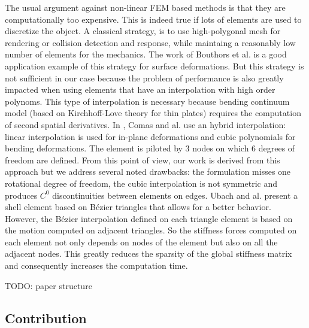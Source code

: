 \documentclass{egpubl}
\begin{document}
The usual argument against non-linear FEM based methods is that they are computationally too expensive. 
This is indeed true if lots of elements are used to discretize the object.
A classical strategy, is to use high-polygonal mesh for rendering or collision detection and response, while maintaing a reasonably low number of elements for the mechanics.
The work of Bouthors et al.\cite{Bouthors2007} is a good application example of this strategy for surface deformations.
But this strategy is not sufficient in our case because the problem of performance is also greatly impacted when using elements that have an interpolation with high order polynoms.
This type of interpolation is necessary because bending continuum model
(based on Kirchhoff-Love theory for thin plates)  requires the computation of second spatial derivatives.
In \cite{Comas2010c}, Comas and al.  use an hybrid interpolation: linear interpolation is used for in-plane deformations and cubic polynomials for bending deformations.
The element is piloted by 3 nodes on which 6 degrees of freedom are defined. 
From this point of view, our work is derived from this approach but we address several noted drawbacks: the formulation misses one rotational degree of freedom, the cubic interpolation is not symmetric and produces $C^0$  discontinuities between elements on edges.
Ubach and al. \cite{Ubach2010}  present a shell element based on B\'ezier triangles that allows for a better behavior.
However, the B\'ezier interpolation defined on each triangle element is based on the motion computed on adjacent triangles.
So the stiffness forces computed on each element not only depends on nodes of the element but also on all the adjacent nodes. 
This greatly reduces the sparsity of the global stiffness matrix and consequently increases the computation time.


TODO: paper structure

\subsection{Contribution}
\end{document}
